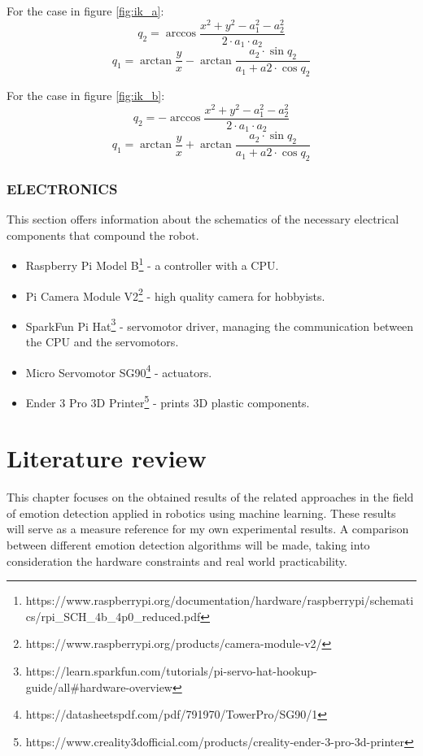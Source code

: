 \documentclass[runningheads,a4paper,12pt]{report}
\begin{document}
For the case in figure \ref{fig:ik_a}:
\[
    q_2 = \arccos \frac{x^2 + y^2 - a_1^2 - a_2^2}{2 \cdot a_1 \cdot a_2}    
\]
\[
    q_1 = \arctan \frac{y}{x} - \arctan \frac{a_2 \cdot \sin q_2}{a_1 + a2 \cdot \cos q_2}
\]

For the case in figure \ref{fig:ik_b}:
\[
    q_2 = - \arccos \frac{x^2 + y^2 - a_1^2 - a_2^2}{2 \cdot a_1 \cdot a_2}    
\]
\[
    q_1 = \arctan \frac{y}{x} + \arctan \frac{a_2 \cdot \sin q_2}{a_1 + a2 \cdot \cos q_2}
\]

\subsection{ELECTRONICS}
This section offers information about the schematics of the necessary electrical components that compound the robot.
\begin{itemize}
\item Raspberry Pi Model B\footnote{https://www.raspberrypi.org/documentation/hardware/raspberrypi/schematics/rpi\_SCH\_4b\_4p0\_reduced.pdf} - a controller with a CPU.

\item Pi Camera Module V2\footnote{https://www.raspberrypi.org/products/camera-module-v2/} - high quality camera for hobbyists.

\item SparkFun Pi Hat\footnote{https://learn.sparkfun.com/tutorials/pi-servo-hat-hookup-guide/all\#hardware-overview} - servomotor driver, managing the communication between the CPU and the servomotors.

\item Micro Servomotor SG90\footnote{https://datasheetspdf.com/pdf/791970/TowerPro/SG90/1} - actuators. 

\item Ender 3 Pro 3D Printer\footnote{https://www.creality3dofficial.com/products/creality-ender-3-pro-3d-printer} - prints 3D plastic components.
\end{itemize}

\newpage

\chapter{Literature review}
\label{chapter:literature}
This chapter focuses on the obtained results of the related approaches in the field of emotion detection applied in robotics using machine learning. These results will serve as a measure reference for my own experimental results. A comparison between different emotion detection algorithms will be made, taking into consideration the hardware constraints and real world practicability. 
\end{document}
